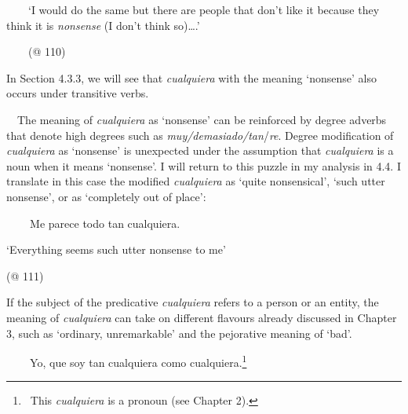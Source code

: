 \begin{styleStandard}
\ \ \ \ ‘I would do the same but there are people that don’t like it because they think it is \textit{nonsense} (I don’t think so)….’
\end{styleStandard}

\begin{styleStandard}
\ \ \ \ (@ 110)
\end{styleStandard}

\begin{styleStandard}
In Section 4.3.3, we will see that \textit{cualquiera} with the meaning ‘nonsense’ also occurs under transitive verbs.
\end{styleStandard}

\begin{styleStandard}
\ \ The meaning of \textit{cualquiera} as ‘nonsense’ can be reinforced by degree adverbs that denote high degrees such as \textit{muy/demasiado/tan}/\textit{re}. Degree modification of \textit{cualquiera} as ‘nonsense’ is unexpected under the assumption that \textit{cualquiera} is a noun when it means ‘nonsense’. I will return to this puzzle in my analysis in 4.4. I translate in this case the modified \textit{cualquiera} as ‘quite nonsensical’, ‘such utter nonsense’, or as ‘completely out of place’:
\end{styleStandard}

\begin{styleStandard}
\textbf{\ \ }\ \ Me parece todo tan cualquiera.
\end{styleStandard}

\begin{styleStandard}
‘Everything seems such utter nonsense to me’
\end{styleStandard}

\begin{styleStandard}
(@ 111)
\end{styleStandard}

\begin{styleStandard}
If the subject of the predicative \textit{cualquiera} refers to a person or an entity, the meaning of \textit{cualquiera} can take on different flavours already discussed in Chapter 3, such as ‘ordinary, unremarkable’ and the pejorative meaning of ‘bad’. 
\end{styleStandard}

\begin{styleStandard}
\textbf{\ \ }\ \ Yo, que soy tan cualquiera como cualquiera.\footnote{\ This \textit{cualquiera} is a pronoun (see Chapter 2).}
\end{styleStandard}

